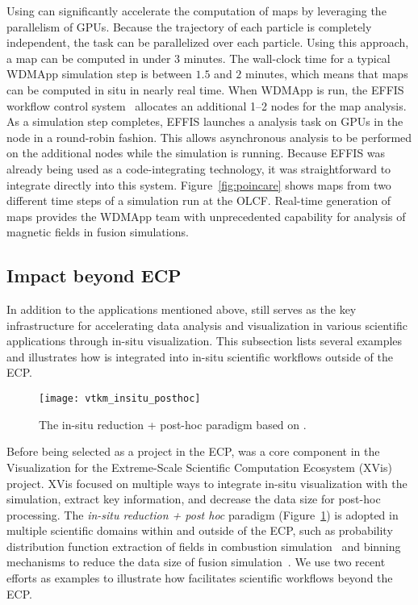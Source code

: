 Using \vtkm can significantly accelerate the computation of \poincare maps by leveraging the parallelism of GPUs. Because the trajectory of each particle is completely independent, the task can be parallelized over each particle. Using this approach, a \poincare map can be computed in under $3$ minutes. The wall-clock time for a typical WDMApp simulation step is between $1.5$ and $2$ minutes, which means that \poincare maps can be computed in situ in nearly real time.
When WDMApp is run, the EFFIS workflow control system~\citep{Suchyta2022:effis} allocates an additional 1--2 nodes for the \poincare map analysis. As a simulation step completes, EFFIS launches a \poincare analysis task on GPUs in the node in a round-robin fashion. This allows asynchronous analysis to be performed on the additional nodes while the simulation is running.
Because EFFIS was already being used as a code-integrating technology, it was straightforward to integrate \vtkm directly into this system.
Figure~\ref{fig:poincare} shows \poincare maps from two different time steps of a simulation run at the OLCF.
Real-time generation of \poincare maps provides the WDMApp team with unprecedented capability for analysis of magnetic fields in fusion simulations.


\subsection{Impact beyond ECP}


In addition to the applications mentioned above, \vtkm still serves as the key infrastructure for accelerating data analysis and visualization in various scientific applications through in-situ visualization. This subsection lists several examples and illustrates how \vtkm is integrated into in-situ scientific workflows outside of the ECP.


\begin{figure}[htb]
  \centering
\texttt{[image: vtkm\_insitu\_posthoc]}
\caption{The in-situ reduction + post-hoc paradigm based on \vtkm.}
\label{fig:vtkm_insitu_posthoc}
\end{figure}

Before being selected as a project in the ECP, \vtkm was a core component in the Visualization for the Extreme-Scale Scientific Computation Ecosystem (XVis)~\citep{Moreland2019} project. 
XVis focused on multiple ways to integrate in-situ visualization with the simulation, extract key information, and decrease the data size for post-hoc processing.
The \textit{in-situ reduction + post hoc} paradigm (Figure~\ref{fig:vtkm_insitu_posthoc}) is adopted in multiple scientific domains within and outside of the ECP, such as probability distribution function extraction of fields in combustion simulation~\citep{Ye2016} and binning mechanisms to reduce the data size of fusion simulation~\citep{Kress2018}. We use two recent efforts as examples to illustrate how \vtkm facilitates scientific workflows beyond the ECP.


